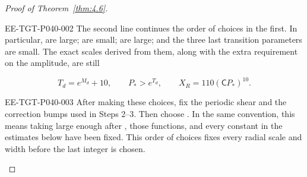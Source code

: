 \begin{proof}[Proof of Theorem~\ref{thm:4.6}]
\begin{EESegment}{EE-TGT-P040-002}
The second line continues the order of choices in the first. In particular,
 are large;
 are small;
 are large; and the three last transition
parameters are small. The exact scales derived from them, along with the extra requirement on the
amplitude, are still
\end{EESegment}
\[
T_d=e^{M_d}+10,\qquad P_*>e^{T_d},\qquad X_R=110(\mathsf C P_*)^{10}.
\]
\begin{EESegment}{EE-TGT-P040-003}
After making these choices, fix the periodic shear and the correction bumps used in Steps 2--3.
Then choose . In the same convention, this
means taking  large enough after
, those functions, and every constant in the estimates
below have been fixed. This order of choices fixes every radial scale and width before the last
integer  is chosen.
\end{EESegment}


\end{proof}
